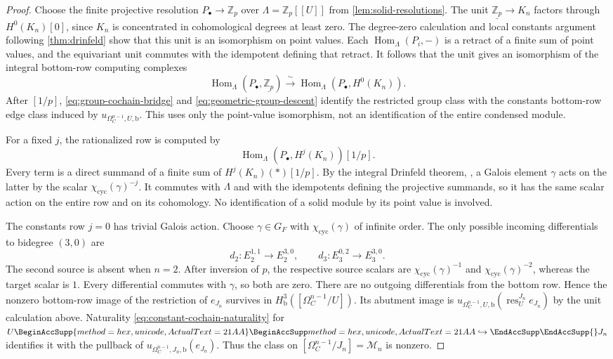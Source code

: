 \documentclass[11pt]{article}
\numberwithin{equation}{section}
\theoremstyle{definition}
\theoremstyle{remark}
\newcommand{\Z}{\mathbb Z}
\DeclareMathOperator{\Hom}{Hom}
\let\UnicodeOriginalHookrightarrow\hookrightarrow
\DeclareRobustCommand{\hookrightarrow}{
  \BeginAccSupp{method=hex,unicode,ActualText=21AA}
  \UnicodeOriginalHookrightarrow\EndAccSupp{}}
\begin{document}
\begin{proof}
Choose the finite projective resolution
$P_\bullet\to\Z_p$ over $\Lambda=\Z_p[[U]]$ from
\cref{lem:solid-resolutions}.  The unit
$\underline{\Z_p}\to K_n$ factors through $H^0(K_n)[0]$, since
$K_n$ is concentrated in cohomological degrees at least zero.
The degree-zero calculation and local constants argument following
\cref{thm:drinfeld} show that this unit is an isomorphism on point
values.  Each $\Hom_\Lambda(P_i,-)$ is a retract of a finite sum of
point values, and the equivariant unit commutes with the idempotent
defining that retract.  It follows that the unit gives an isomorphism
of the integral bottom-row computing complexes
\[
 \Hom_\Lambda(P_\bullet,\underline{\Z_p})
       \xrightarrow{\ \sim\ }
 \Hom_\Lambda(P_\bullet,H^0(K_n)).
\]
After $[1/p]$, \eqref{eq:group-cochain-bridge} and
\eqref{eq:geometric-group-descent} identify the restricted group
class with the constants bottom-row edge class induced by
$u_{\Omega_C^{n-1},U,\mathrm b}$.  This uses only the point-value
isomorphism, not an identification of the entire condensed module.

For a fixed $j$, the rationalized row is
computed by
\[
 \Hom_\Lambda(P_\bullet,H^j(K_n))[1/p].
\]
Every term is a direct summand of a finite sum of
$H^j(K_n)(*)[1/p]$.  By the integral Drinfeld theorem,
\cite[Theorem 1.1]{CDN2021}, a Galois element $\gamma$ acts on the latter
by the scalar $\chi_{\mathrm{cyc}}(\gamma)^{-j}$.
It commutes with $\Lambda$ and with the idempotents defining the
projective summands, so it has the same scalar action on the entire
row and on its cohomology.  No identification of a solid module by
its point value is involved.

The constants row $j=0$ has trivial Galois action.
Choose $\gamma\in G_F$ with $\chi_{\mathrm{cyc}}(\gamma)$ of infinite
order.  The only possible incoming differentials to bidegree $(3,0)$
are
\[
 d_2:E_2^{1,1}\longrightarrow E_2^{3,0},
 \qquad
 d_3:E_3^{0,2}\longrightarrow E_3^{3,0}.
\]
The second source is absent when $n=2$.
After inversion of $p$, the respective source scalars are
$\chi_{\mathrm{cyc}}(\gamma)^{-1}$ and
$\chi_{\mathrm{cyc}}(\gamma)^{-2}$, whereas the target scalar is $1$.
Every differential commutes with $\gamma$, so both are zero.
There are no outgoing differentials from the bottom row.
Hence the nonzero bottom-row image of the restriction of $e_{J_n}$
survives in $H^3_{\mathrm b}([\Omega_C^{n-1}/U])$.
Its abutment image is
$u_{\Omega_C^{n-1},U,\mathrm b}(\operatorname{res}^{J_n}_U e_{J_n})$
by the unit calculation
above.  Naturality \eqref{eq:constant-cochain-naturality} for
$U\hookrightarrow J_n$ identifies it with the pullback of
$u_{\Omega_C^{n-1},J_n,\mathrm b}(e_{J_n})$.
Thus the class on $[\Omega_C^{n-1}/J_n]=\mathcal M_n$ is nonzero.


\end{proof}
\end{document}
